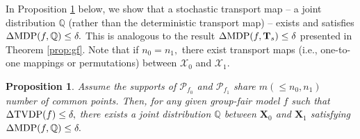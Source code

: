 \documentclass[10pt]{article} %
\newtheorem{proposition}[theorem]{Proposition}
\begin{document}
        In Proposition \ref{rmk:prop:gf_extension} below, we show that a stochastic transport map -- a joint distribution $\mathbb{Q}$ (rather than the deterministic transport map) --
        exists and satisfies $\Delta \textup{MDP}(f, \mathbb{Q}) \le \delta.$
        This is analogous to the result $\Delta \textup{MDP}(f, \mathbf{T}_{s}) \le \delta$ presented in Theorem \ref{prop:gf}.
        Note that if $n_{0} = n_{1},$ there exist transport maps (i.e., one-to-one mappings or permutations) between $\mathcal{X}_{0}$ and $\mathcal{X}_{1}.$

        \begin{proposition}\label{rmk:prop:gf_extension}
            Assume the supports of $\mathcal{P}_{f_{0}}$ and $\mathcal{P}_{f_{1}}$ share $m (\le n_{0}, n_{1})$ number of common points.
            Then, for any given group-fair model $f$ such that $\Delta \textup{TVDP}(f) \le \delta,$
            there exists a joint distribution $\mathbb{Q}$ between $\mathbf{X}_{0}$ and $\mathbf{X}_{1}$ satisfying 
            $\Delta \textup{MDP}(f, \mathbb{Q}) \le \delta.$
        \end{proposition}
\end{document}
